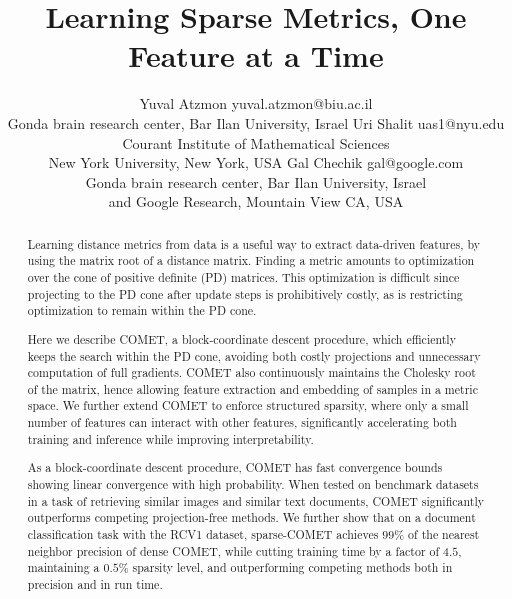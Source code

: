 \documentclass[twoside,11pt]{article}
\begin{document}
\title{Learning Sparse Metrics, One Feature at a Time}


\author{\name Yuval Atzmon \email yuval.atzmon@biu.ac.il \\
       \addr Gonda brain research center, Bar Ilan University, Israel
       \AND
       \name Uri Shalit \email uas1@nyu.edu \\
       \addr Courant Institute of Mathematical Sciences \\
       New York University, New York, USA
       \AND
      \name Gal Chechik \email gal@google.com \\
       \addr Gonda brain research center, Bar Ilan University, Israel \\
       and Google Research, Mountain View CA, USA}

\maketitle
\vskip -15pt
\begin{abstract}%

Learning distance metrics from data is a useful way to extract data-driven features, by using the matrix root of a distance matrix. Finding a metric amounts to optimization over the cone of positive definite (PD) matrices. This optimization is difficult since projecting to the PD cone after update steps is prohibitively costly, as is restricting optimization to remain within the PD cone.

Here we describe COMET, a block-coordinate descent procedure, which efficiently keeps the search within the PD cone, avoiding both costly projections and unnecessary computation of full gradients. COMET also continuously maintains the Cholesky root of the matrix, hence allowing feature extraction and embedding of samples in a metric space. We further extend COMET to enforce structured sparsity, where only a small number of features can interact with other features, significantly accelerating both training and inference while improving interpretability.
 
As a block-coordinate descent procedure, COMET has fast convergence bounds showing linear convergence with high probability. When tested on benchmark datasets in a task of retrieving similar images and similar text documents, COMET significantly outperforms competing projection-free methods. We further show that on a document classification task with the RCV1 dataset, sparse-COMET achieves $99\%$ of the nearest neighbor precision of dense COMET, while cutting training time by a factor of $4.5$, maintaining a $0.5\%$ sparsity level, and outperforming competing methods both in precision and in run time. 
\end{abstract}
\end{document}
